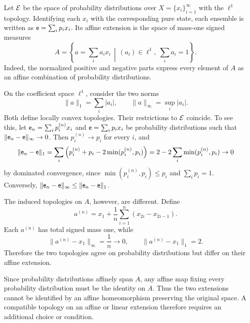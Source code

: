 \begin{example}
	Let $\mathcal{E}$ be the space of probability distributions over $X = \{x_i\}_{i=1}^{\infty}$ with the $\ell^1$ topology. Identifying each $x_i$ with the corresponding pure state, each ensemble is written as $\mathsf{e} = \sum_i p_i x_i$. Its affine extension is the space of mass-one signed measures
	\begin{equation}
		A = \left\{a = \sum_i a_i x_i \,\middle|\, (a_i) \in \ell^1,\; \sum_i a_i = 1\right\}.
	\end{equation}
	Indeed, the normalized positive and negative parts express every element of $A$ as an affine combination of probability distributions.
	
	On the coefficient space $\ell^1$, consider the two norms
	\begin{equation}
		\|a\|_1 = \sum_i |a_i|,
		\qquad
		\|a\|_\infty = \sup_i |a_i|.
	\end{equation}
	Both define locally convex topologies. Their restrictions to $\mathcal{E}$ coincide. To see this, let $\mathsf{e}_n = \sum_i p_i^{(n)} x_i$ and $\mathsf{e} = \sum_i p_i x_i$ be probability distributions such that $\|\mathsf{e}_n-\mathsf{e}\|_\infty \to 0$. Then $p_i^{(n)} \to p_i$ for every $i$, and
	\begin{equation}
		\|\mathsf{e}_n-\mathsf{e}\|_1
		= \sum_i \left(p_i^{(n)} + p_i - 2 \min(p_i^{(n)},p_i)\right)=  2 - 2\sum_i \min(p_i^{(n)},p_i)
		\to 0
	\end{equation}
	by dominated convergence, since $\min(p_i^{(n)},p_i) \leq p_i$ and $\sum_i p_i=1$. Conversely, $\|\mathsf{e}_n-\mathsf{e}\|_\infty \leq \|\mathsf{e}_n-\mathsf{e}\|_1$.
	
	The induced topologies on $A$, however, are different. Define
	\begin{equation}
		a^{(n)} = x_1 + \frac{1}{n}\sum_{i=1}^{n}
		(x_{2i}-x_{2i-1}).
	\end{equation}
	Each $a^{(n)}$ has total signed mass one, while
	\begin{equation}
		\|a^{(n)}-x_1\|_\infty = \frac{1}{n} \to 0,
		\qquad
		\|a^{(n)}-x_1\|_1 = 2.
	\end{equation}
	Therefore the two topologies agree on probability distributions but differ on their affine extension.
\end{example}

Since probability distributions affinely span $A$, any affine map fixing every probability distribution must be the identity on $A$. Thus the two extensions cannot be identified by an affine homeomorphism preserving the original space. A compatible topology on an affine or linear extension therefore requires an additional choice or condition.

